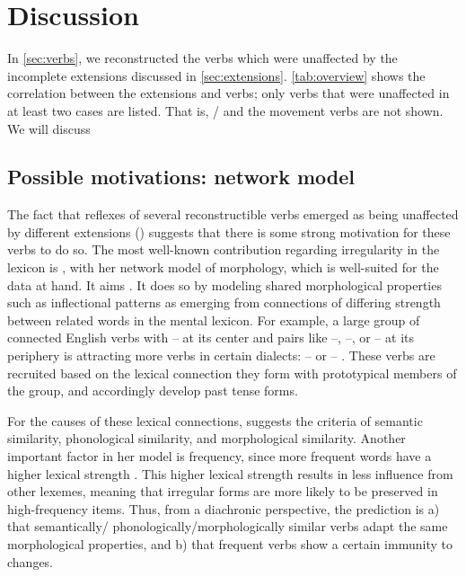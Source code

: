 \section{Discussion}
\label{sec:discussion}
In \cref{sec:verbs}, we reconstructed the verbs which were unaffected by the incomplete extensions discussed in \cref{sec:extensions}.
\cref{tab:overview} shows the correlation between the extensions and verbs; only verbs that were unaffected in at least two cases are listed.
That is, \trio {}/  and the \akuriyo movement verbs are not shown.
We will discuss



\subsection{Possible motivations:  network model}
\label{sec:motivations}
The fact that reflexes of several reconstructible verbs emerged as being unaffected by different extensions () suggests that there is some strong motivation for these verbs to do so.
The most well-known contribution regarding irregularity in the lexicon is \textcite{bybee1985morphology}, with her network model of morphology, which is well-suited for the data at hand.
It aims  \parencite[428]{bybee1995regular}.
It does so by modeling shared morphological properties such as inflectional patterns as emerging from connections of differing strength between related words in the mental lexicon.
For example, a large group of connected  English verbs with -- at its center and pairs like --, --, or -- at its periphery is attracting more verbs in certain dialects: -- or -- \parencite[129--130]{bybee1985morphology}.
These verbs are recruited based on the lexical connection they form with prototypical members of the group, and accordingly develop  past tense forms.

For the causes of these lexical connections, \textcite[118]{bybee1985morphology} suggests the criteria of semantic similarity, phonological similarity, and morphological similarity.
Another important factor in her model is frequency, since more frequent words have a higher lexical strength \parencite[119]{bybee1985morphology}.
This higher lexical strength results in less influence from other lexemes, meaning that irregular forms are more likely to be preserved in high-frequency items.
Thus, from a diachronic perspective, the prediction is a) that semantically\slash{} phonologically\slash{}morphologically similar verbs adapt the same morphological properties, and b) that frequent verbs show a certain immunity to changes.

